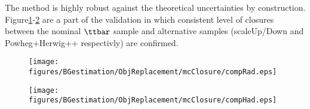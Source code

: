 
\clearpage
The method is highly robust against the theoretical uncertainties by construction. Figure\ref{fig::Uncertainties::objRep_theoSys_compRad}-\ref{fig::Uncertainties::objRep_theoSys_compHad} are a part of the validation in which consistent level of closures between the nominal $\ttbar$ sample and alternative samples (scaleUp/Down and Powheg+Herwig++ respectivly) are confirmed.

\begin{figure}
  \begin{center}
    \texttt{[image: figures/BGestimation/ObjReplacement/mcClosure/compRad.eps]}
    \label{fig::Uncertainties::objRep_theoSys_compRad}
  \end{center}
\end{figure}
\begin{figure}
  \begin{center}
    \texttt{[image: figures/BGestimation/ObjReplacement/mcClosure/compHad.eps]}
    \label{fig::Uncertainties::objRep_theoSys_compHad}
  \end{center}
\end{figure}
